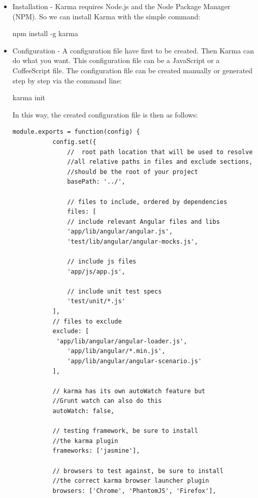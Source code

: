 \documentclass[11pt]{article}
\begin{document}
\begin{itemize}
\item Installation - Karma requires Node.js and the Node Package Manager (NPM). So we can install Karma with the simple command:

\textdollar{} npm install -g karma
\item Configuration - A configuration file have first to be created. Then Karma can do what you want. This configuration file can be a JavaScript or a CoffeeScript file. The configuration file can be created manually or generated step by step via the command line:

\textdollar{} karma init

In this way, the created configuration file is then as follows:

\begin{lstlisting}[caption=Karma configuration file ]
       module.exports = function(config) {  
           config.set({  
               //  root path location that will be used to resolve  
               //all relative paths in files and exclude sections,  
               //should be the root of your project  
               basePath: '../',  
         
               // files to include, ordered by dependencies  
               files: [  
               // include relevant Angular files and libs  
               'app/lib/angular/angular.js',  
               'test/lib/angular/angular-mocks.js',  
     
               // include js files  
               'app/js/app.js',  
     
               // include unit test specs  
               'test/unit/*.js'  
           ],  
           // files to exclude  
           exclude: [  
            'app/lib/angular/angular-loader.js',  
               'app/lib/angular/*.min.js',  
               'app/lib/angular/angular-scenario.js'  
           ],  
     
           // karma has its own autoWatch feature but  
           //Grunt watch can also do this  
           autoWatch: false,  
     
           // testing framework, be sure to install  
           //the karma plugin  
           frameworks: ['jasmine'],  
     
           // browsers to test against, be sure to install   
           //the correct karma browser launcher plugin  
           browsers: ['Chrome', 'PhantomJS', 'Firefox'],  
     

\end{lstlisting}
\end{itemize}
\end{document}
